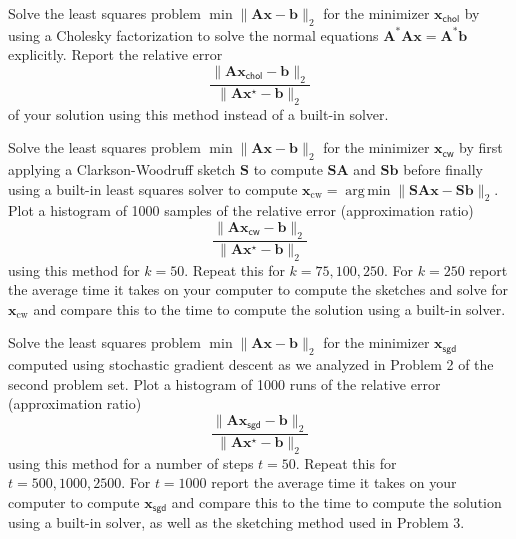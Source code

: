 \documentclass[12pt,letterpaper,cm]{hmcpset}
\newcommand\A{\boldsymbol{A}}
\renewcommand\S{\boldsymbol{S}}
\renewcommand\b{\boldsymbol{b}}
\newcommand\x{\boldsymbol{x}}
\begin{document}
\begin{problem}[2]
    Solve the least squares problem $\min\|\A\x - \b\|_2$ for the minimizer $\x_\textsf{chol}$ by using a Cholesky factorization to solve the normal equations $\A^*\A\x = \A^*\b$ explicitly. Report the relative error
    \[
        \frac{\|\A\x_\textsf{chol} - \b\|_2}{\|\A\x^\star - \b\|_2}
    \]
    of your solution using this method instead of a built-in solver.
\end{problem}

\begin{solution}
\end{solution}

\begin{problem}[3]
    Solve the least squares problem $\min\|\A\x - \b\|_2$ for the minimizer $\x_\textsf{cw}$ by first applying a Clarkson-Woodruff sketch $\S$ to compute $\S\A$ and $\S\b$ before finally using a built-in least squares solver to compute $\x_\text{cw} = \operatorname{arg\,min}\|\S\A\x - \S\b\|_2$. Plot a histogram of 1000 samples of the relative error (approximation ratio)
    \[
        \frac{\|\A\x_\textsf{cw} - \b\|_2}{\|\A\x^\star - \b\|_2}
    \]
    using this method for $k=50$. Repeat this for $k=75,100,250$. For $k=250$ report the average time it takes on your computer to compute the sketches and solve for $\x_\text{cw}$ and compare this to the time to compute the solution using a built-in solver.
\end{problem}

\begin{solution}
\end{solution}

\begin{problem}[4]
    Solve the least squares problem $\min\|\A\x - \b\|_2$ for the minimizer $\x_\textsf{sgd}$ computed using stochastic gradient descent as we analyzed in Problem 2 of the second problem set. Plot a histogram of 1000 runs of the relative error (approximation ratio)
    \[
        \frac{\|\A\x_\textsf{sgd} - \b\|_2}{\|\A\x^\star - \b\|_2}
    \]
    using this method for a number of steps $t=50$. Repeat this for $t=500,1000,2500$. For $t=1000$ report the average time it takes on your computer to compute $\x_\textsf{sgd}$ and compare this to the time to compute the solution using a built-in solver, as well as the sketching method used in Problem 3.
\end{problem}

\begin{solution}
\end{solution}
\end{document}
